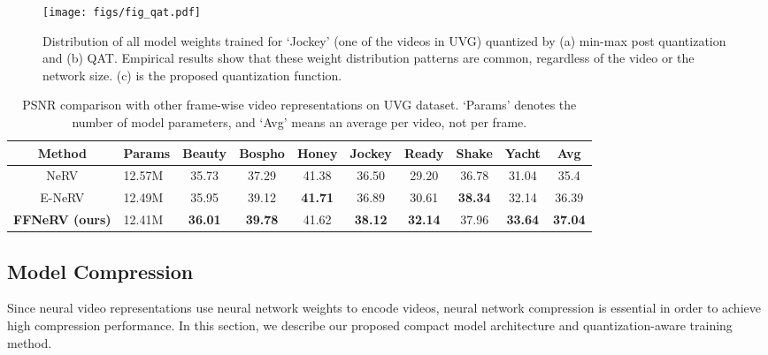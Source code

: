 \documentclass[sigconf]{acmart}
\begin{document}
\begin{figure}[t]
\begin{center}
\texttt{[image: figs/fig\_qat.pdf]}
\end{center}
   \caption{Distribution of all model weights trained for `Jockey' (one of the videos in UVG) quantized by (a) min-max post quantization and (b) QAT.
Empirical results show that these weight distribution patterns are common, regardless of the video or the network size.
   (c) is the proposed quantization function. }
\label{fig_qat}
\end{figure}

\begin{table*}[t]
\caption{PSNR comparison with other frame-wise video representations on UVG dataset. `Params' denotes the number of model parameters, and `Avg' means an average per video, not per frame. }
\vskip 0.15in
\centering
\begin{tabular}{c|l||ccccccc||c}
\hline
 Method               & Params & Beauty & Bospho & Honey & Jockey & Ready & Shake & Yacht & Avg   \\ \hline\hline
NeRV   & 12.57M          & 35.73           & 37.29           & 41.38          & 36.50           & 29.20          & 36.78          & 31.04          & 35.4  \\ \hline
E-NeRV & 12.49M          & 35.95           & 39.12           & \textbf{41.71}          & 36.89           & 30.61          & \textbf{38.34}          & 32.14          & 36.39 \\ \hline
\textbf{FFNeRV (ours)}   & 12.41M          & \textbf{36.01}           & \textbf{39.78}           & 41.62          & \textbf{38.12}           & \textbf{32.14}          & 37.96          & \textbf{33.64}          & \textbf{37.04} \\ \hline
\end{tabular}
\label{tab_rep}
\end{table*}

\subsection{Model Compression}
Since neural video representations use neural network weights to encode videos, neural network compression is essential in order to achieve high compression performance.
In this section, we describe our proposed compact model architecture and quantization-aware training method.
\end{document}
